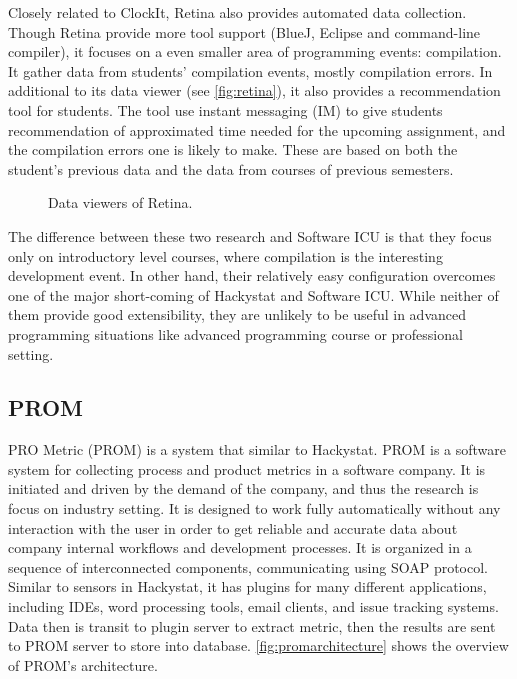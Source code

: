 Closely related to ClockIt, Retina also provides automated data collection. Though Retina provide more tool support (BlueJ, Eclipse and command-line compiler), it focuses on a even smaller area of programming events: compilation. It gather data from students' compilation events, mostly compilation errors. In additional to its data viewer (see \autoref{fig:retina}), it also provides a recommendation tool for students. The tool use instant messaging (IM) to give students recommendation of approximated time needed for the upcoming assignment, and the compilation errors one is likely to make. These are based on both the student's previous data and the data from courses of previous semesters. 

\begin{figure}[htbp]
     \centering
          
     \caption{Data viewers of Retina.}
     \label{fig:retina}
\end{figure}

The difference between these two research and Software ICU is that they focus only on introductory level courses, where compilation is the interesting development event. In other hand, their relatively easy configuration overcomes one of the major short-coming of Hackystat and Software ICU. While neither of them provide good extensibility, they are unlikely to be useful in advanced programming situations like advanced programming course or professional setting.

\subsection {PROM}
PRO Metric (PROM) \cite{prom03} is a system that similar to Hackystat. PROM is a software system for collecting process and product metrics in a software company. It is initiated and driven by the demand of the company, and thus the research is focus on industry setting. It is designed to work fully automatically without any interaction with the user in order to get reliable and accurate data about company internal workflows and development processes. It is organized in a sequence of interconnected components, communicating using SOAP protocol. Similar to sensors in Hackystat, it has plugins for many different applications, including IDEs, word processing tools, email clients, and issue tracking systems. Data then is transit to plugin server to extract metric, then the results are sent to PROM server to store into database. \autoref{fig:promarchitecture} shows the overview of PROM's architecture.

